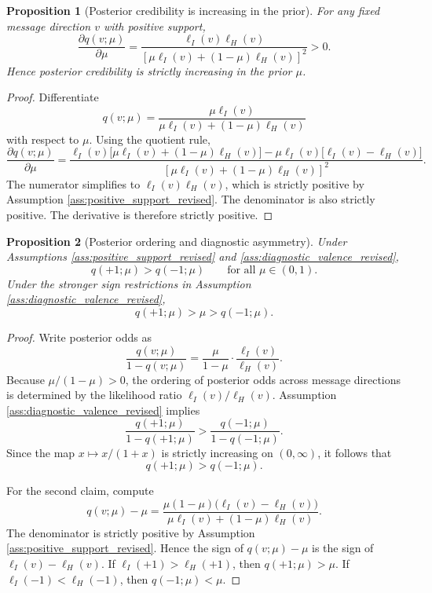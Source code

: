 \documentclass[12pt,american]{article}
\newtheorem{proposition}{Proposition}
\begin{document}
\begin{refsection}
		\begin{proposition}[Posterior credibility is increasing in the prior]
			\label{prop:q_monotone}
			For any fixed message direction \(v\) with positive support,
			\[
			\frac{\partial q(v;\mu)}{\partial \mu}
			=
			\frac{\ell_I(v)\ell_H(v)}
			{\left[\mu \ell_I(v)+(1-\mu)\ell_H(v)\right]^2}>0.
			\]
			Hence posterior credibility is strictly increasing in the prior \(\mu\).
		\end{proposition}
		
		\begin{proof}
			Differentiate
			\[
			q(v;\mu)=\frac{\mu \ell_I(v)}{\mu \ell_I(v)+(1-\mu)\ell_H(v)}
			\]
			with respect to \(\mu\). Using the quotient rule,
			\[
			\frac{\partial q(v;\mu)}{\partial \mu}
			=
			\frac{\ell_I(v)\big[\mu \ell_I(v)+(1-\mu)\ell_H(v)\big]-\mu \ell_I(v)\big[\ell_I(v)-\ell_H(v)\big]}
			{\left[\mu \ell_I(v)+(1-\mu)\ell_H(v)\right]^2}.
			\]
			The numerator simplifies to \(\ell_I(v)\ell_H(v)\), which is strictly positive by Assumption \ref{ass:positive_support_revised}. The denominator is also strictly positive. The derivative is therefore strictly positive.
		\end{proof}
		
		\begin{proposition}[Posterior ordering and diagnostic asymmetry]
			\label{prop:posterior_ordering_revised}
			Under Assumptions \ref{ass:positive_support_revised} and \ref{ass:diagnostic_valence_revised},
			\[
			q(+1;\mu)>q(-1;\mu)
			\qquad\text{for all } \mu\in(0,1).
			\]
			Under the stronger sign restrictions in Assumption \ref{ass:diagnostic_valence_revised},
			\[
			q(+1;\mu)>\mu>q(-1;\mu).
			\]
		\end{proposition}
		
		\begin{proof}
			Write posterior odds as
			\[
			\frac{q(v;\mu)}{1-q(v;\mu)}
			=
			\frac{\mu}{1-\mu}\cdot \frac{\ell_I(v)}{\ell_H(v)}.
			\]
			Because \(\mu/(1-\mu)>0\), the ordering of posterior odds across message directions is determined by the likelihood ratio \(\ell_I(v)/\ell_H(v)\). Assumption \ref{ass:diagnostic_valence_revised} implies
			\[
			\frac{q(+1;\mu)}{1-q(+1;\mu)}
			>
			\frac{q(-1;\mu)}{1-q(-1;\mu)}.
			\]
			Since the map \(x\mapsto x/(1+x)\) is strictly increasing on \((0,\infty)\), it follows that
			\[
			q(+1;\mu)>q(-1;\mu).
			\]
			
			For the second claim, compute
			\[
			q(v;\mu)-\mu
			=
			\frac{\mu(1-\mu)\big(\ell_I(v)-\ell_H(v)\big)}
			{\mu \ell_I(v)+(1-\mu)\ell_H(v)}.
			\]
			The denominator is strictly positive by Assumption \ref{ass:positive_support_revised}. Hence the sign of \(q(v;\mu)-\mu\) is the sign of \(\ell_I(v)-\ell_H(v)\). If \(\ell_I(+1)>\ell_H(+1)\), then \(q(+1;\mu)>\mu\). If \(\ell_I(-1)<\ell_H(-1)\), then \(q(-1;\mu)<\mu\).
		\end{proof}
		

\end{refsection}
\end{document}

